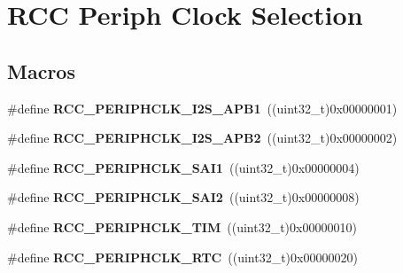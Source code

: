 \hypertarget{group___r_c_c_ex___periph___clock___selection}{}\section{R\+CC Periph Clock Selection}
\label{group___r_c_c_ex___periph___clock___selection}
\subsection*{Macros}
\begin{DoxyCompactItemize}
\item 
\#define {\bfseries R\+C\+C\+\_\+\+P\+E\+R\+I\+P\+H\+C\+L\+K\+\_\+\+I2\+S\+\_\+\+A\+P\+B1}~((uint32\+\_\+t)0x00000001)\hypertarget{group___r_c_c_ex___periph___clock___selection_ga0a06d077e6088c506968b4bdee30d3b9}{}\label{group___r_c_c_ex___periph___clock___selection_ga0a06d077e6088c506968b4bdee30d3b9}

\item 
\#define {\bfseries R\+C\+C\+\_\+\+P\+E\+R\+I\+P\+H\+C\+L\+K\+\_\+\+I2\+S\+\_\+\+A\+P\+B2}~((uint32\+\_\+t)0x00000002)\hypertarget{group___r_c_c_ex___periph___clock___selection_ga45fa4cc48e03b0b0e1a3450bceeeac07}{}\label{group___r_c_c_ex___periph___clock___selection_ga45fa4cc48e03b0b0e1a3450bceeeac07}

\item 
\#define {\bfseries R\+C\+C\+\_\+\+P\+E\+R\+I\+P\+H\+C\+L\+K\+\_\+\+S\+A\+I1}~((uint32\+\_\+t)0x00000004)\hypertarget{group___r_c_c_ex___periph___clock___selection_ga9b5a57e48c326c3b477b8361f6f246b8}{}\label{group___r_c_c_ex___periph___clock___selection_ga9b5a57e48c326c3b477b8361f6f246b8}

\item 
\#define {\bfseries R\+C\+C\+\_\+\+P\+E\+R\+I\+P\+H\+C\+L\+K\+\_\+\+S\+A\+I2}~((uint32\+\_\+t)0x00000008)\hypertarget{group___r_c_c_ex___periph___clock___selection_ga7030f1b97abf4c891da0506fbd5df96b}{}\label{group___r_c_c_ex___periph___clock___selection_ga7030f1b97abf4c891da0506fbd5df96b}

\item 
\#define {\bfseries R\+C\+C\+\_\+\+P\+E\+R\+I\+P\+H\+C\+L\+K\+\_\+\+T\+IM}~((uint32\+\_\+t)0x00000010)\hypertarget{group___r_c_c_ex___periph___clock___selection_ga6a377fb8665c389cb263cddbfa44bec6}{}\label{group___r_c_c_ex___periph___clock___selection_ga6a377fb8665c389cb263cddbfa44bec6}

\item 
\#define {\bfseries R\+C\+C\+\_\+\+P\+E\+R\+I\+P\+H\+C\+L\+K\+\_\+\+R\+TC}~((uint32\+\_\+t)0x00000020)\hypertarget{group___r_c_c_ex___periph___clock___selection_gaede03aaafb5319bb39767bf50182406f}{}\label{group___r_c_c_ex___periph___clock___selection_gaede03aaafb5319bb39767bf50182406f}


\end{DoxyCompactItemize}
